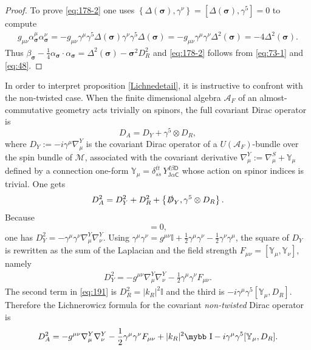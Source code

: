 \documentclass[11pt]{article}
\newcommand{\M}{\mathcal M}
\newcommand{\A}{\mathcal A}
\newcommand{\sig}{{\boldsymbol{\sigma}}}
\def\bb#1{\hbox{\mybb#1}}
\newcommand{\sJ}{\mathrm J}
\newcommand{\sC}{\mathsf C}
\newcommand{\sD}{\mathsf D}
\begin{document}
\begin{proof}
To prove \eqref{eq:178-2} one uses $\left\{\Delta(\sig), \gamma^\nu\right\} = \left[\Delta(\sig), \gamma^5\right] = 0$ to compute
 \begin{align}
  \label{eq:15}
 g_{\mu\nu}\alpha^\mu_{\sig}\alpha^{\nu}_{\sig}= -
  g_{\mu\nu}\gamma^\mu\gamma^5\Delta(\sig)
  \gamma^\nu\gamma^5\Delta(\sig)=  -
  g_{\mu\nu}\gamma^\mu\gamma^\nu\Delta^2(\sig)   = -4\Delta^2(\sig).
\end{align}
Thus 
$\beta_\sig - \frac 14\alpha_{\sig}\cdot \alpha_{\sig} = \Delta^2(\sig)- \sig^2 D_R^2
$
and \eqref{eq:178-2} follows from \eqref{eq:73-1} and \eqref{eq:48}.
\end{proof}
\medskip

In order to interpret proposition \ref{Lichnedetail}, it is instructive
  to confront with the
  non-twisted case.  When the finite dimensional algebra $\A_F$ of an almost-commutative geometry acts trivially on
spinors, the full covariant Dirac operator is
\begin{equation}
  \label{eq:185}
  D_A = D_Y + \gamma^5\otimes D_R,
\end{equation}
where
$D_Y := -i\gamma^\mu \nabla^Y_\mu\label{eq:163}
$
is the covariant Dirac operator of a $U(\A_F)$-bundle over the spin
bundle of $\M$, associated with the covariant derivative
$\nabla_\mu^Y:= \nabla_\mu^S + {\mathbb Y}_\mu$
defined by a connection one-form $\mathbb{Y}_\mu
= \delta_{s\dot s}^{t\dot t}\, Y_{\sJ\alpha\sC}^{I\beta\sD}$ whose action on spinor indices is trivial. One gets
\begin{equation}
  \label{eq:191}
   D_A^2 = D_Y ^ 2 + D_R^2 + \left\{\slashed D_Y, \gamma^5\otimes D_R\right\}.
\end{equation}
Because 
\begin{equation}
[\gamma^\mu, \mathbb{Y}_\nu]= 0,
\label{eq:162}
\end{equation}
one has
    $D_Y^2 = - \gamma^\mu \gamma^\nu \nabla^Y_\mu \nabla^Y_\nu$.
Using 
$\gamma^\mu\gamma^\nu = g^{\mu\nu}\mathbb{I}  + \frac 12
\gamma^\mu\gamma^\nu - \frac 12 \gamma^\nu\gamma^\mu$, the square of
$D_Y$ is rewritten
as the sum of the Laplacian and the field strength 
$F_{\mu\nu} =\left[{\mathbb Y}_\mu, \mathbb{Y}_\nu\right]$, namely 
\begin{align}
  \label{eq:158}
 D_Y^2 = 
  -g^{\mu\nu} \nabla_\mu^Y \nabla_\nu^Y - \frac 12\gamma^\mu \gamma^\nu F_{\mu\nu}.
\end{align}
The second term in \eqref{eq:191} is $D_R^2=
|k_R|^2\mathbb{I}$ and the third is  $-i\gamma^\mu\gamma^5
[\mathbb{Y}_\mu,D_R]$. Therefore the Lichnerowicz formula for the
covariant \emph{non-twisted} Dirac operator is
\begin{equation}
  \label{eq:186}
  D_A^2= - g^{\mu\nu}\nabla_\mu^Y\nabla_\nu^Y - \frac 12\gamma^\mu\gamma^\nu
    F_{\mu\nu} + |k_R|^2{\bb I} - i\gamma^\mu\gamma^5 [{\mathbb Y}_\mu,D_R].
\end{equation}
\end{document}
